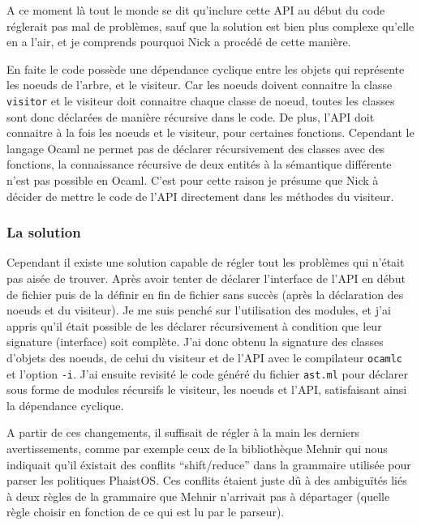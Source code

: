 A ce moment là tout le monde se dit qu'inclure cette API au début du code 
réglerait pas mal de problèmes, sauf que la solution est bien plus complexe 
qu'elle en a l'air, et je comprends pourquoi Nick a procédé de cette manière.

En faite le code possède une dépendance cyclique entre les objets qui 
représente les noeuds de l'arbre, et le visiteur. Car les noeuds doivent 
connaitre la classe \texttt{visitor} et le visiteur doit connaitre chaque 
classe de noeud, toutes les classes sont donc déclarées de manière récursive 
dans le code. De plus, l'API doit connaitre à la fois les noeuds et le 
visiteur, pour certaines fonctions. Cependant le langage Ocaml ne permet pas de 
déclarer récursivement des classes avec des fonctions, la connaissance 
récursive de deux entités à la sémantique différente n'est pas possible en 
Ocaml. C'est pour cette raison je présume que Nick à décider de mettre le code de l'API directement dans les méthodes du visiteur.

\subsubsection{La solution}

Cependant il existe une solution capable de régler tout les problèmes qui 
n'était pas aisée de trouver. Après avoir tenter de déclarer l'interface de 
l'API en début de fichier puis de la définir en fin de fichier sans succès 
(après la déclaration des noeuds et du visiteur). Je me suis penché sur 
l'utilisation des modules, et j'ai appris qu'il était possible de les déclarer 
récursivement à condition que leur signature (interface) soit complète. J'ai 
donc obtenu la signature des classes d'objets des noeuds, de celui du visiteur 
et de l'API avec le compilateur \texttt{ocamlc} et l'option \texttt{-i}. J'ai 
ensuite revisité le code généré du fichier \texttt{ast.ml} pour déclarer sous 
forme de modules récursifs le visiteur, les noeuds et l'API, satisfaisant ainsi 
la dépendance cyclique.

A partir de ces changements, il suffisait de régler à la main les derniers 
avertissements, comme par exemple ceux de la bibliothèque Mehnir qui nous 
indiquait qu'il éxistait des conflits ``shift/reduce'' dans la grammaire 
utilisée pour parser les politiques PhaistOS. Ces conflits étaient juste dû à 
des ambiguïtés liés à deux règles de la grammaire que Mehnir n'arrivait pas à 
départager (quelle règle choisir en fonction de ce qui est lu par le parseur). 

